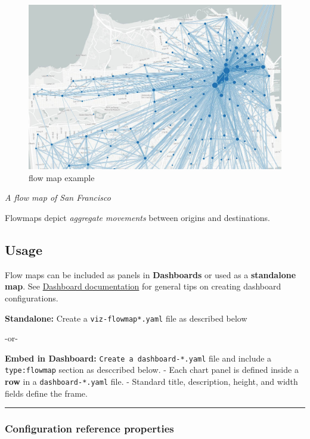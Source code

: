 \begin{figure}
\centering
\includegraphics{assets/flow-map.jpg}
\caption{flow map example}
\end{figure}

\emph{A flow map of San Francisco}

Flowmaps depict \emph{aggregate movements} between origins and
destinations.

\hypertarget{usage}{%
\subsection{Usage}\label{usage}}

Flow maps can be included as panels in \textbf{Dashboards} or used as a
\textbf{standalone map}. See \href{dashboards}{Dashboard documentation}
for general tips on creating dashboard configurations.

\textbf{Standalone:} Create a \texttt{viz-flowmap*.yaml} file as
described below

-or-

\textbf{Embed in Dashboard:} \texttt{Create\ a\ dashboard-*.yaml} file
and include a \texttt{type:flowmap} section as desccribed below. - Each
chart panel is defined inside a \textbf{row} in a
\texttt{dashboard-*.yaml} file. - Standard title, description, height,
and width fields define the frame.

\begin{center}\rule{0.5\linewidth}{0.5pt}\end{center}

\hypertarget{configuration-reference-properties}{%
\subsubsection{Configuration reference
properties}\label{configuration-reference-properties}}

